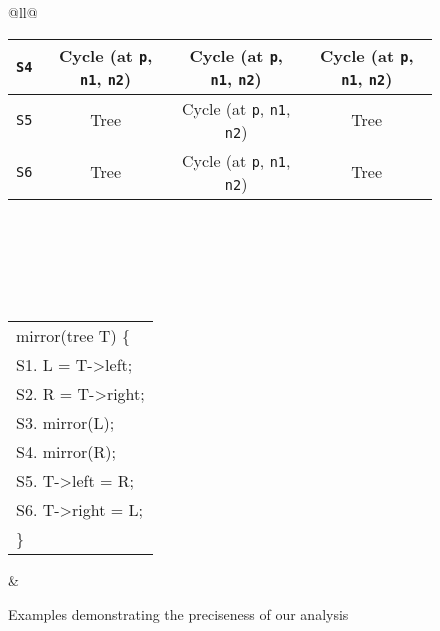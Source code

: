 \documentclass{sig-alternate}
\begin{document}
\begin{figure*}[t]
{\begin{tabular}{@{}ll@{}}
{\begin{tabular}[b]{|c||c|c|c|}
	  {\tt S4}       & Cycle (at {\tt p}, {\tt n1}, {\tt n2}) 	   & Cycle (at {\tt p}, {\tt n1}, {\tt n2}) & Cycle (at {\tt p}, {\tt n1}, {\tt n2}) \\ \hline
	  {\tt S5}       & Tree		  & Cycle (at {\tt p}, {\tt n1}, {\tt n2})                       & Tree \\ \hline
	  {\tt S6}       & Tree		  & Cycle (at {\tt p}, {\tt n1}, {\tt n2})                       & Tree \\ \hline
    \end{tabular}
  } \\
   \\ \\
  {\small \tt
    \begin{tabular}[b]{l}
      mirror(tree T) \{ \\
      S1.    L  = T->left; \\
      S2.    R = T->right; \\
      S3.    mirror(L); \\
      S4.    mirror(R); \\
      S5.    T->left = R; \\
      S6.    T->right = L; \\
      \}  
    \end{tabular}
  } &
   \\
\end{tabular}}
\caption{Examples demonstrating the preciseness of our analysis\label{fig:benchmark_2}}
\end{figure*}
\end{document}
